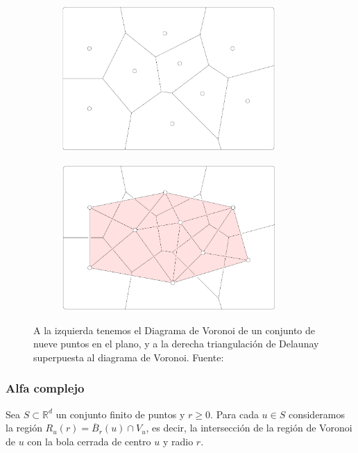 \begin{figure}[!ht]
\centering
\begin{subfigure}[b]{0.4\textwidth}
	\centering
	\includegraphics[width=0.9\textwidth]{include/figuras/voronoi.png} 
\end{subfigure}
\begin{subfigure}[b]{0.4\textwidth}
	\centering
	\includegraphics[width=0.9\textwidth]{include/figuras/delaunay.png} 
\end{subfigure}
\caption{A la izquierda tenemos el Diagrama de Voronoi de un conjunto de nueve puntos en el plano, y a la derecha triangulación de Delaunay superpuesta al diagrama de Voronoi. Fuente: \cite{libroEH}}
\label{ref:vor-del}
\end{figure}

\subsubsection*{Alfa complejo}
Sea $S \subset \mathbb{R}^d$ un conjunto finito de puntos y $r \geq 0$. Para cada $u \in S$ consideramos la región $R_u(r)= \overline{B}_r(u) \cap V_u$, es decir, la intersección de la región de Voronoi de $u$ con la bola cerrada de centro $u$ y radio $r$.

